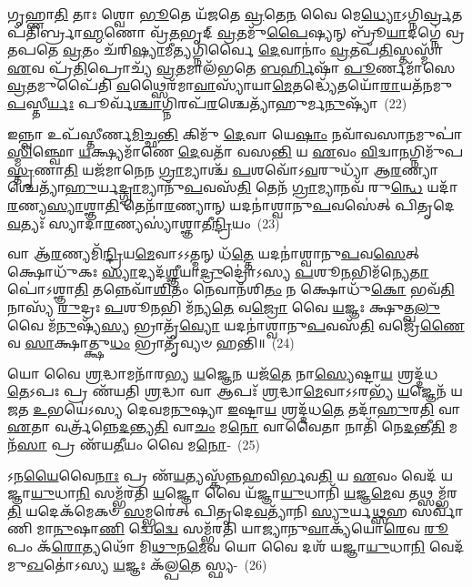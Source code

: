 𑌗𑍃𑌹𑍍𑌣𑌾\-\ul{𑌤𑌿} 𑌤𑌾𑌃 𑌶𑍍𑌵𑍋 \ul{𑌭𑍂}\-𑌤𑍇 𑌯᳴𑌜𑌤𑍇 \ul{𑌵𑍍𑌰}\-𑌤𑍇\-\ul{𑌨} 𑌵𑍈 𑌮𑍇\-\ul{𑌧𑍍𑌯𑍋}\-\-𑌽𑌗𑍍𑌨𑌿\-\ul{𑌰𑍍𑌵𑍍𑌰}\-𑌤𑌪᳴𑌤𑌿𑌰𑍍𑌬𑍍𑌰𑌾\-\ul{𑌹𑍍𑌮}\-𑌣𑍋 𑌵𑍍𑌰᳴\-\ul{𑌤}\-𑌭𑍃𑌦𑍍 \ul{𑌵𑍍𑌰}\-𑌤𑌮𑍁᳴\-\ul{𑌪𑍈}\-𑌷𑍍𑌯𑌨𑍍 𑌬𑍍𑌰𑍂᳴\-\ul{𑌯𑌾}\-𑌦𑌗𑍍𑌨𑍇॑ 𑌵𑍍𑌰𑌤𑌪𑌤𑍇 \ul{𑌵𑍍𑌰}\-𑌤𑌂 𑌚᳴𑌰𑌿\-\ul{𑌷𑍍𑌯𑌾}\-𑌮𑍀\-\ul{𑌤𑍍𑌯}\-𑌗𑍍𑌨𑌿𑌰𑍍𑌵𑍈 \ul{𑌦𑍇}\-𑌵𑌾𑌨𑌾𑌂॑ \ul{𑌵𑍍𑌰}\-𑌤𑌪᳴\-\ul{𑌤𑌿}\-𑌸𑍍𑌤𑌸𑍍𑌮𑌾᳴ \ul{𑌏}\-𑌵 𑌪𑍍𑌰᳴\-\ul{𑌤𑌿}\-𑌪𑍍𑌰𑍋𑌚𑍍𑌯᳴ \ul{𑌵𑍍𑌰}\-𑌤𑌮𑌾𑌲᳴𑌭𑌤𑍇 \ul{𑌬}\-\-\ul{𑌰𑍍}\-\mbox{}𑌹𑌿𑌷𑌾᳴ \ul{𑌪𑍂}\-𑌰𑍍𑌣𑌮𑌾᳴𑌸𑍇 \ul{𑌵𑍍𑌰}\-𑌤𑌮𑍁𑌪𑍈᳴𑌤𑌿 \ul{𑌵}\-𑌥𑍍𑌸𑍈𑌰᳴𑌮𑌾\-\ul{𑌵𑌾}\-𑌸𑍍𑌯𑌾᳴𑌯𑌾\-\ul{𑌮𑍇}\-𑌤𑌦𑍍𑌧𑍍𑌯𑍇᳴𑌤𑌯𑍋᳴\-\ul{𑌰𑌾}\-𑌯𑌤᳴𑌨𑌮𑍁\-\ul{𑌪}\-𑌸𑍍𑌤𑍀\-\ul{𑌰𑍍𑌯𑌃} 𑌪𑍂𑌰𑍍𑌵᳴\-\ul{𑌶𑍍𑌚𑌾}\-𑌗𑍍𑌨𑌿𑌰𑌪᳴\-\ul{𑌰}\-\-𑌶𑍍𑌚𑍇𑌤𑍍𑌯𑌾᳴𑌹𑍁𑌰𑍍𑌮\-\ul{𑌨𑍁}\-𑌷𑍍𑌯𑌾᳴~(22)

𑌇𑌨𑍍𑌨𑍍𑌵𑌾 𑌉𑌪᳴𑌸𑍍𑌤𑍀𑌰𑍍𑌣\-\ul{𑌮𑌿}\-𑌚𑍍𑌛\-\ul{𑌨𑍍𑌤𑌿} 𑌕𑌿𑌮𑍁᳴ \ul{𑌦𑍇}\-𑌵𑌾 𑌯𑍇\-\ul{𑌷𑌾𑌂} 𑌨𑌵𑌾᳴𑌵𑌸𑌾\-\ul{𑌨}\-\-𑌮𑍁𑌪𑌾॑\-\ul{𑌸𑍍𑌮𑌿}\-𑌞𑍍𑌛𑍍𑌵𑍋 \ul{𑌯}\-𑌕𑍍𑌷𑍍𑌯𑌮𑌾᳴𑌣𑍇 \ul{𑌦𑍇}\-𑌵𑌤𑌾᳴ 𑌵𑌸\-\ul{𑌨𑍍𑌤𑌿} 𑌯 \ul{𑌏}\-𑌵𑌂 \ul{𑌵𑌿}\-𑌦𑍍𑌵𑌾\-\ul{𑌨}\-𑌗𑍍𑌨𑌿𑌮𑍁᳴𑌪\-\ul{𑌸𑍍𑌤𑍃}\-𑌣𑌾\-\ul{𑌤𑌿} 𑌯𑌜᳴𑌮𑌾𑌨𑍇𑌨 \ul{𑌗𑍍𑌰𑌾}\-𑌮𑍍𑌯𑌾𑌶𑍍𑌚᳴ \ul{𑌪}\-𑌶𑌵𑍋᳴\-𑌽\-\ul{𑌵}\-𑌰𑍁𑌧𑍍𑌯𑌾᳴ 𑌆\-\ul{𑌰}\-𑌣𑍍𑌯𑌾𑌶𑍍𑌚𑍇𑌤𑍍𑌯𑌾᳴\-\-\ul{𑌹𑍁}\-𑌰𑍍𑌯\-\ul{𑌦𑍍𑌗𑍍𑌰𑌾}\-𑌮𑍍𑌯𑌾𑌨𑍁᳴\-\ul{𑌪}\-\-𑌵𑌸᳴\-\ul{𑌤𑌿} 𑌤𑍇𑌨᳴ \ul{𑌗𑍍𑌰𑌾}\-𑌮𑍍𑌯𑌾𑌨𑌵᳴ 𑌰𑍁\-\ul{𑌨𑍍𑌧𑍇} 𑌯𑌦𑌾᳴\-\ul{𑌰}\-𑌣𑍍𑌯\-\ul{𑌸𑍍𑌯𑌾}\-𑌶𑍍𑌞𑌾\-\ul{𑌤𑌿} 𑌤𑍇𑌨𑌾᳴\-\ul{𑌰}\-𑌣𑍍𑌯𑌾𑌨𑍍 𑌯𑌦𑌨𑌾॑𑌶𑍍𑌵𑌾𑌨𑍁\-\ul{𑌪}\-𑌵𑌸𑍇॑𑌤𑍍 𑌪𑌿𑌤𑍃𑌦𑍇\-\ul{𑌵}\-𑌤𑍍𑌯𑌃᳴ 𑌸𑍍𑌯𑌾𑌦𑌾\-\ul{𑌰}\-𑌣𑍍𑌯𑌸𑍍𑌯𑌾॑𑌶𑍍𑌞𑌾𑌤𑍀\-\ul{𑌨𑍍𑌦𑍍𑌰𑌿}\-𑌯𑌂~(23)

𑌵𑌾 𑌆᳴\-\ul{𑌰}\-𑌣𑍍𑌯𑌮𑌿᳴\-\ul{𑌨𑍍𑌦𑍍𑌰𑌿}\-𑌯\-\ul{𑌮𑍇}\-𑌵𑌾\-𑌽\-𑌽𑌤𑍍𑌮𑌨𑍍 𑌧᳴\-\ul{𑌤𑍍𑌤𑍇} 𑌯𑌦𑌨𑌾॑𑌶𑍍𑌵𑌾𑌨𑍁\-\ul{𑌪}\-𑌵\-\ul{𑌸𑍇}\-𑌤𑍍 𑌕𑍍𑌷𑍋𑌧𑍁᳴𑌕𑌃 \ul{𑌸𑍍𑌯𑌾}\-𑌦𑍍𑌯𑌦᳴\-\ul{𑌶𑍍𑌞𑍀}\-𑌯𑌾\-\ul{𑌦𑍍𑌰𑍁}\-𑌦𑍍𑌰𑍋॑\-𑌽𑌸𑍍𑌯 \ul{𑌪}\-𑌶𑍂\-\ul{𑌨}\-𑌭𑌿𑌮᳴𑌨𑍍𑌯𑍇\-\ul{𑌤𑌾}\-𑌪𑍋॑\-𑌽𑌶𑍍𑌞𑌾\-\ul{𑌤𑌿} 𑌤𑌨𑍍𑌨𑍇𑌵𑌾᳴\-\ul{𑌶𑌿}\-𑌤𑌂 𑌨𑍇𑌵𑌾𑌨᳴𑌶𑌿\-\ul{𑌤𑌂} 𑌨 𑌕𑍍𑌷𑍋𑌧𑍁᳴\-\ul{𑌕𑍋} 𑌭𑌵᳴\-\ul{𑌤𑌿} 𑌨𑌾𑌸𑍍𑌯᳴ \ul{𑌰𑍁}\-𑌦𑍍𑌰𑌃 \ul{𑌪}\-𑌶𑍂\-\ul{𑌨}\-𑌭𑌿 𑌮᳴𑌨𑍍𑌯\-\ul{𑌤𑍇} 𑌵\-\ul{𑌜𑍍𑌰𑍋} 𑌵𑍈 \ul{𑌯}\-𑌜𑍍𑌞𑌃 𑌕𑍍𑌷𑍁𑌤𑍍𑌖\-\ul{𑌲𑍁} 𑌵𑍈 𑌮᳴\-\ul{𑌨𑍁}\-𑌷𑍍𑌯᳴\-\ul{𑌸𑍍𑌯} 𑌭𑍍𑌰𑌾𑌤𑍃᳴\-\ul{𑌵𑍍𑌯𑍋} 𑌯𑌦𑌨𑌾॑𑌶𑍍𑌵𑌾𑌨𑍁\-\ul{𑌪}\-𑌵𑌸᳴\-\ul{𑌤𑌿} 𑌵𑌜𑍍𑌰𑍇᳴\-\ul{𑌣𑍈}\-𑌵 \ul{𑌸𑌾}\-𑌕𑍍𑌷𑌾𑌤𑍍𑌕𑍍𑌷𑍁\-\ul{𑌧𑌂} 𑌭𑍍𑌰𑌾𑌤𑍃᳴𑌵𑍍𑌯𑍞 𑌹𑌨𑍍𑌤𑌿॥~(24)

{\anuvakamend[{𑌪𑌰𑌿᳴ 𑌮\-\ul{𑌨𑍁}\-𑌷𑍍𑌯𑌾᳴ 𑌇\-\ul{𑌨𑍍𑌦𑍍𑌰𑌿}\-𑌯𑍞 \ul{𑌸𑌾}\-𑌕𑍍𑌷𑌾𑌤𑍍 𑌤𑍍𑌰𑍀𑌣𑌿᳴ 𑌚}]}%

𑌯𑍋 𑌵𑍈 \ul{𑌶𑍍𑌰}\-𑌦𑍍𑌧𑌾𑌮𑌨𑌾᳴𑌰𑌭𑍍𑌯 \ul{𑌯}\-𑌜𑍍𑌞𑍇\-\ul{𑌨} 𑌯𑌜᳴\-\ul{𑌤𑍇} 𑌨𑌾\-\ul{𑌸𑍍𑌯𑍇}\-𑌷𑍍𑌟𑌾\-\ul{𑌯} 𑌶𑍍𑌰𑌦𑍍𑌦᳴𑌧\-\ul{𑌤𑍇}\-\-𑌽𑌪𑌃 𑌪𑍍𑌰 𑌣᳴𑌯𑌤𑌿 \ul{𑌶𑍍𑌰}\-𑌦𑍍𑌧𑌾 𑌵𑌾 𑌆𑌪𑌃᳴ \ul{𑌶𑍍𑌰}\-𑌦𑍍𑌧𑌾\-\ul{𑌮𑍇}\-𑌵𑌾\-𑌽\-𑌽𑌰𑌭𑍍𑌯᳴ \ul{𑌯}\-𑌜𑍍𑌞𑍇𑌨᳴ 𑌯𑌜𑌤 \ul{𑌉}\-𑌭𑌯𑍇॑\-𑌽𑌸𑍍𑌯 𑌦𑍇𑌵𑌮\-\ul{𑌨𑍁}\-𑌷𑍍𑌯𑌾 \ul{𑌇}\-𑌷𑍍𑌟𑌾\-\ul{𑌯} 𑌶𑍍𑌰𑌦𑍍𑌦᳴𑌧\-\ul{𑌤𑍇} 𑌤𑌦𑌾᳴\-\ul{𑌹𑍁}\-𑌰\-\ul{𑌤𑌿} 𑌵𑌾 \ul{𑌏}\-𑌤𑌾 𑌵𑌰𑍍𑌤𑍍𑌰᳴𑌨𑍍𑌨𑍇\-\ul{𑌦}\-𑌨𑍍𑌤𑍍𑌯\-\ul{𑌤𑌿} 𑌵𑌾\-\ul{𑌚𑌂} 𑌮\-\ul{𑌨𑍋} 𑌵𑌾𑌵𑍈𑌤𑌾 𑌨𑌾𑌤𑌿᳴ 𑌨𑍇\-\ul{𑌦}\-𑌨𑍍𑌤𑍀\-\ul{𑌤𑌿} 𑌮𑌨᳴\-\ul{𑌸𑌾} 𑌪𑍍𑌰 𑌣᳴𑌯\-\ul{𑌤𑍀}\-𑌯𑌂 𑌵𑍈 𑌮\-\ul{𑌨𑍋}\--~(25)

𑌽𑌨\-\ul{𑌯𑍈}\-𑌵𑍈\-\ul{𑌨𑌾𑌃} 𑌪𑍍𑌰 𑌣᳴\-\ul{𑌯}\-𑌤𑍍𑌯𑌸𑍍𑌕᳴𑌨𑍍𑌨𑌹𑌵𑌿𑌰𑍍𑌭𑌵\-\ul{𑌤𑌿} 𑌯 \ul{𑌏}\-𑌵𑌂 𑌵𑍇𑌦᳴ 𑌯𑌜𑍍𑌞𑌾\-\ul{𑌯𑍁}\-𑌧𑌾\-\ul{𑌨𑌿} 𑌸𑌮𑍍𑌭᳴𑌰𑌤𑌿 \ul{𑌯}\-𑌜𑍍𑌞𑍋 𑌵𑍈 𑌯᳴𑌜𑍍𑌞𑌾\-\ul{𑌯𑍁}\-𑌧𑌾𑌨𑌿᳴ \ul{𑌯}\-𑌜𑍍𑌞\-\ul{𑌮𑍇}\-𑌵 𑌤𑌥𑍍𑌸𑌮𑍍𑌭᳴𑌰\-\ul{𑌤𑌿} 𑌯𑌦𑍇𑌕᳴𑌮𑍇𑌕𑍞 \ul{𑌸}\-𑌮𑍍𑌭𑌰𑍇॑𑌤𑍍 𑌪𑌿𑌤𑍃𑌦𑍇\-\ul{𑌵}\-𑌤𑍍𑌯𑌾᳴𑌨𑌿 \ul{𑌸𑍍𑌯𑍁}\-𑌰𑍍𑌯\-\ul{𑌥𑍍𑌸}\-𑌹 𑌸𑌰𑍍𑌵𑌾᳴𑌣𑌿 𑌮𑌾\-\ul{𑌨𑍁}\-𑌷𑌾\-\ul{𑌣𑌿} 𑌦𑍍𑌵𑍇\-\ul{𑌦𑍍𑌵𑍇} 𑌸𑌮𑍍𑌭᳴𑌰𑌤𑌿 𑌯𑌾𑌜𑍍𑌯𑌾𑌨𑍁\-\ul{𑌵𑌾}\-𑌕𑍍𑌯᳴𑌯𑍋\-\ul{𑌰𑍇}\-𑌵 \ul{𑌰𑍂}\-𑌪𑌂 𑌕᳴\-\ul{𑌰𑍋}\-𑌤𑍍𑌯𑌥𑍋᳴ 𑌮𑌿\-\ul{𑌥𑍁}\-𑌨\-\ul{𑌮𑍇}\-𑌵 𑌯𑍋 𑌵𑍈 𑌦𑌶᳴ 𑌯𑌜𑍍𑌞𑌾\-\ul{𑌯𑍁}\-𑌧𑌾\-\ul{𑌨𑌿} 𑌵𑍇𑌦᳴ 𑌮𑍁\-\ul{𑌖}\-𑌤𑍋॑\-𑌽𑌸𑍍𑌯 \ul{𑌯}\-𑌜𑍍𑌞𑌃 𑌕᳴𑌲𑍍𑌪\-\ul{𑌤𑍇} 𑌸𑍍𑌫𑍍𑌯-~(26)

